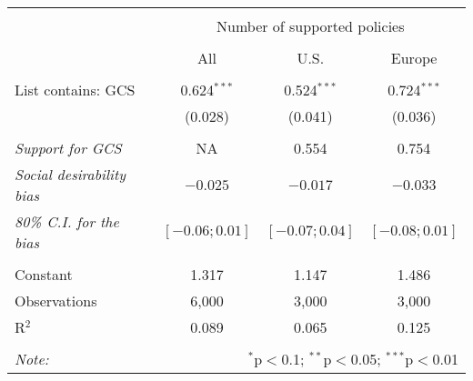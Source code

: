 
\begin{tabular}{@{\extracolsep{5pt}}lccc} 
\\[-1.8ex]\hline 
\hline \\[-1.8ex] 
 & \multicolumn{3}{c}{Number of supported policies} \\ 
\cline{2-4} 
\\[-1.8ex] & All & U.S. & Europe \\ 
\hline \\[-1.8ex] 
 List contains: GCS & 0.624$^{***}$ & 0.524$^{***}$ & 0.724$^{***}$ \\ 
  & (0.028) & (0.041) & (0.036) \\ 
\hline  \\[-1.8ex] \textit{Support for GCS} & NA  &  0.554  &  0.754 \\
\textit{Social desirability bias} & \textit{$ -0.025 $} & \textit{$ -0.017 $} & \textit{$ -0.033 $}\\
\textit{80\% C.I. for the bias} & \textit{ $[ -0.06 ; 0.01 ]$ } & \textit{ $[ -0.07 ; 0.04 ]$} & \textit{ $[ -0.08 ; 0.01 ]$}\\
 \hline \\[-1.8ex] 
Constant & 1.317 & 1.147 & 1.486 \\ 
Observations & 6,000 & 3,000 & 3,000 \\ 
R$^{2}$ & 0.089 & 0.065 & 0.125 \\ 
\hline 
\hline \\[-1.8ex] 
\textit{Note:}  & \multicolumn{3}{r}{$^{*}$p$<$0.1; $^{**}$p$<$0.05; $^{***}$p$<$0.01} \\ 
\end{tabular} 